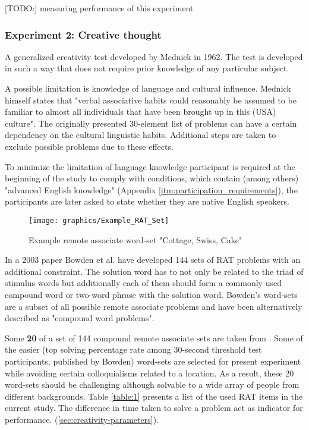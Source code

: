 				[TODO:] measuring performance of this experiment
		
		\subsubsection{Experiment 2: Creative thought} \label{sec:creativity}
		
		A generalized creativity test developed by Mednick \cite{Mednick1962} in 1962. The test is developed in such a way that does not require prior knowledge of any particular subject. 
		
		A possible limitation is knowledge of language and cultural influence. Mednick himself states that "verbal associative habits could reasonably be assumed to be familiar to almost all individuals that have been brought up in this (USA) culture". The originally presented 30-element list of problems can have a certain dependency on the cultural linguistic habits. Additional steps are taken to exclude possible problems due to these effects. \
		
		To minimize the limitation of language knowledge participant is required at the beginning of the study to comply with conditions, which contain (among others) "advanced English knowledge" (Appendix \ref{itm:participation_requirements}), the participants are later asked to state whether they are native English speakers.
		 
		
		
		\begin{figure}[h]
			\centering
			\texttt{[image: graphics/Example\_RAT\_Set]}
			\caption{Example remote associate word-set "Cottage, Swiss, Cake"}
			\label{fig:exampleratset}
		\end{figure}


		In a 2003 paper Bowden et al. \cite{Bowden} have developed 144 sets of RAT problems with an additional constraint. The solution word has to not only be related to the triad of stimulus words but additionally each of them should form a commonly used compound word or two-word phrase with the solution word.
		Bowden's word-sets are a subset of all possible remote associate problems and have been alternatively described as "compound word problems".
		
		
		Some \textbf{20} of a set of 144 compound remote associate sets are taken from \cite{Bowden}. Some of the easier (top solving percentage rate among 30-second threshold test participants, published by Bowden) word-sets are selected for present experiment while avoiding certain colloquialisms related to a location. As a result, these 20 word-sets should be challenging although solvable to a wide array of people from different backgrounds. Table \ref{table:1} presents a list of the used RAT items in the current study. The difference in time taken to solve a problem act as indicator for performance. (\ref{sec:creativity-parameters}).
		
